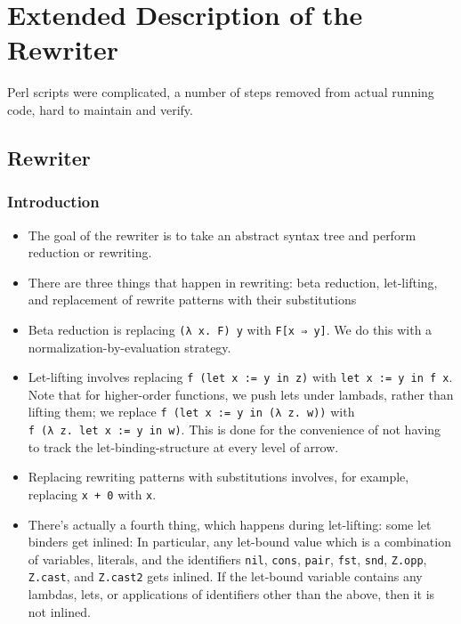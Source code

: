 \chapter{Extended Description of the Rewriter}
 Perl scripts were complicated, a number of steps removed from actual running code, hard to maintain and verify.
\section{Rewriter}\label{rewriter}

\subsection{Introduction}\label{introduction}

\begin{itemize}
\tightlist
\item
  The goal of the rewriter is to take an abstract syntax tree and
  perform reduction or rewriting.
\item
  There are three things that happen in rewriting: beta reduction,
  let-lifting, and replacement of rewrite patterns with their
  substitutions
\item
  Beta reduction is replacing \texttt{(λ\ x.\ F)\ y} with
  \texttt{F{[}x\ ⇒\ y{]}}. We do this with a normalization-by-evaluation
  strategy.
\item
  Let-lifting involves replacing \texttt{f\ (let\ x\ :=\ y\ in\ z)} with
  \texttt{let\ x\ :=\ y\ in\ f\ x}. Note that for higher-order
  functions, we push lets under lambads, rather than lifting them; we
  replace \texttt{f\ (let\ x\ :=\ y\ in\ (λ\ z.\ w))} with
  \texttt{f\ (λ\ z.\ let\ x\ :=\ y\ in\ w)}. This is done for the
  convenience of not having to track the let-binding-structure at every
  level of arrow.
\item
  Replacing rewriting patterns with substitutions involves, for example,
  replacing \texttt{x\ +\ 0} with \texttt{x}.
\item
  There's actually a fourth thing, which happens during let-lifting:
  some let binders get inlined: In particular, any let-bound value which
  is a combination of variables, literals, and the identifiers
  \texttt{nil}, \texttt{cons}, \texttt{pair}, \texttt{fst},
  \texttt{snd}, \texttt{Z.opp}, \texttt{Z.cast}, and \texttt{Z.cast2}
  gets inlined. If the let-bound variable contains any lambdas, lets, or
  applications of identifiers other than the above, then it is not
  inlined.
\end{itemize}

